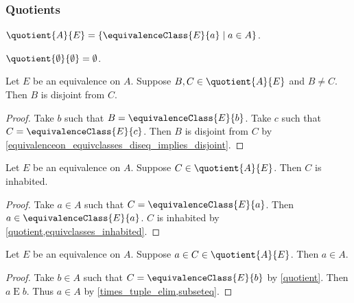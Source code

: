\subsubsection{Quotients}

\begin{definition}\label{quotient}
    $\quotient{A}{E} = \{\equivalenceClass{E}{a}\mid a\in A\}$.
\end{definition}


\begin{proposition}\label{quotient_emptyset}
    $\quotient{\emptyset}{\emptyset} = \emptyset$.
\end{proposition}


\begin{proposition}\label{quotient_elems_disjoint}
    Let $E$ be an equivalence on $A$.
    Suppose $B,C\in\quotient{A}{E}$ and $B\neq C$.
    Then $B$ is disjoint from $C$.
\end{proposition}
\begin{proof}
    Take $b$ such that $B = \equivalenceClass{E}{b}$.
    Take $c$ such that $C = \equivalenceClass{E}{c}$.
    Then $B$ is disjoint from $C$ by \cref{equivalenceon_equivclasses_diseq_implies_disjoint}.
\end{proof}

\begin{proposition}\label{quotient_elems_inhabited}
    Let $E$ be an equivalence on $A$.
    Suppose $C\in\quotient{A}{E}$.
    Then $C$ is inhabited.
\end{proposition}
\begin{proof}
    Take $a\in A$ such that $C = \equivalenceClass{E}{a}$.
    Then $a\in \equivalenceClass{E}{a}$.
    $C$ is inhabited by \cref{quotient,equivclasses_inhabited}.
\end{proof}

\begin{proposition}\label{quotient_elems_type}
    Let $E$ be an equivalence on $A$.
    Suppose $a\in C\in\quotient{A}{E}$.
    Then $a\in A$.
\end{proposition}
\begin{proof}
    Take $b\in A$ such that $C = \equivalenceClass{E}{b}$
        by \cref{quotient}.
    Then $a\mathrel{E} b$.
    Thus $a\in A$ by \cref{times_tuple_elim,subseteq}.
\end{proof}


